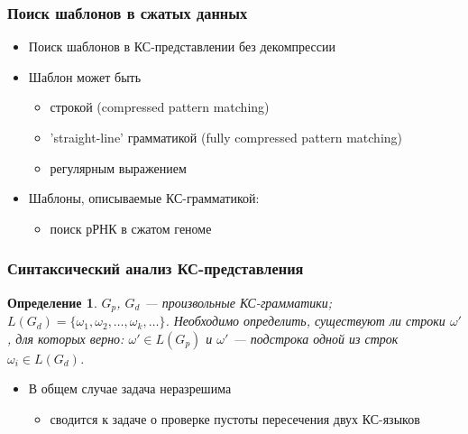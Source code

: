 \documentclass{beamer}
\newtheorem{defn}[theorem]{Определение}
\begin{document}
\begin{frame}
  \transwipe[direction=90]
  \frametitle{Поиск шаблонов в сжатых данных}
	\begin{itemize}
		\item Поиск шаблонов в КС-представлении без декомпрессии
		\item Шаблон может быть
		\begin{itemize}
			\item строкой (compressed pattern matching)
			\item 'straight-line' грамматикой (fully compressed pattern matching)
			\item регулярным выражением
		\end{itemize}
		\pause
			\item Шаблоны, описываемые КС-грамматикой: 
			\begin{itemize}
				\item поиск рРНК в сжатом геноме
			\end{itemize}
	\end{itemize}
\end{frame}

\begin{frame}
	\transwipe[direction=90]
	\frametitle{Синтаксический анализ КС-представления}
	\begin{defn}
		$G_p$, $G_d$ --- произвольные КС-грамматики; $L(G_d) = \{\omega_1, \omega_2, \dots, \omega_k, \dots \}$. Необходимо определить, существуют ли строки $\omega'$, для которых верно: $\omega' \in L(G_p)$ и $\omega'$ --- подстрока одной из строк $\omega_i \in L(G_d)$.
	\end{defn}
	\begin{itemize}
		\item В общем случае задача неразрешима
		\begin{itemize}
			\item сводится к задаче о проверке пустоты пересечения двух КС-языков
		\end{itemize}
	\end{itemize}
\end{frame}
\end{document}
